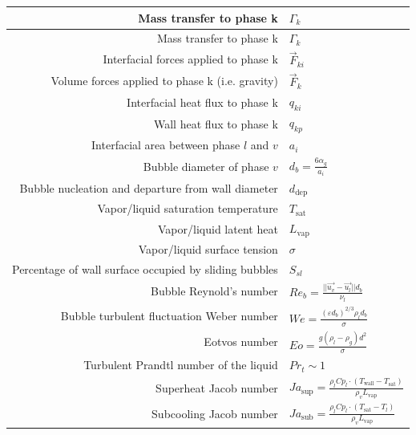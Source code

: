 \documentclass[a4paper,12pt]{report}
\renewcommand{\vec}{\overrightarrow}
\begin{document}
\begin{center}
\begin{tabular}{|r|l|}
	Mass transfer to phase k
		& $\Gamma_k $ \\ \hline
	Mass transfer to phase k
		& $\Gamma_k $ \\ \hline
	Interfacial forces applied to phase k
		& $\vec{F}_{ki}$  \\ \hline
	Volume forces applied to phase k (i.e. gravity)
		& $\vec{F}_k$  \\ \hline
	Interfacial heat flux to phase k
		& $q_{ki}$ \\ \hline
	Wall heat flux to phase k
		& $q_{kp} $ \\ \hline
	Interfacial area between phase $l$ and $v$
		& $a_i$ \\ \hline
	Bubble diameter of phase $v$
		& $	d_b = \frac{6 \alpha_g}{a_i} $ \\ \hline
	Bubble nucleation and departure from wall diameter
		& $d_\text{dep}$ \\ \hline
	Vapor/liquid saturation temperature
		& $T_\text{sat}$ \\ \hline
	Vapor/liquid latent heat
		& $L_\text{vap}$ \\ \hline
	Vapor/liquid surface tension
		& $\sigma$ \\ \hline
	Percentage of wall surface occupied by sliding bubbles
		& $S_{sl}$ \\ \hline
	Bubble Reynold's number
		& $Re_b = \frac{||\overrightarrow{u_v}-\overrightarrow{u_l}|| d_b}{\nu_l}$ \\ \hline
	Bubble turbulent fluctuation Weber number
		& $We = \frac{(\varepsilon d_b)^{2/3} \rho_l d_b}{\sigma}$ \\ \hline
	Eotvos number
		&  $Eo = \frac{g(\rho_l-\rho_g)d^2}{\sigma}$ \\ \hline
	Turbulent Prandtl number of the liquid
		& $Pr_t \sim 1 $ \\ \hline
	Superheat Jacob number
		& $Ja_\text{sup} = \frac{\rho_l Cp_l \cdot (T_\text{wall} - T_\text{sat})}{\rho_v L_\text{vap}}$ \\ \hline
	Subcooling Jacob number
		& $Ja_\text{sub} = \frac{\rho_l Cp_l \cdot (T_\text{sat} - T_l)}{\rho_v L_\text{vap}}$ \\ \hline
\end{tabular}
\end{center}

\pagebreak


\cleardoublepage

\cleardoublepage


\cleardoublepage
\end{document}

